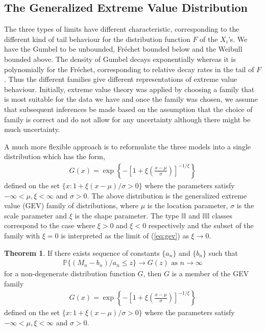 \documentclass[a4paper,10pt]{article}
\theoremstyle{definition}
\newtheorem{thm}{Theorem}[section]
\numberwithin{equation}{section}
\begin{document}
\subsection{The Generalized Extreme Value Distribution}
The three types of limits have different characteristic, corresponding to the different kind of tail behaviour for the distribution function $F$ of the $X_i$'s. We have the Gumbel to be unbounded, Fr\'echet bounded below and the Weibull bounded above. The density of Gumbel decays exponentially whereas it is polynomially for the Fr\'echet, corresponding to relative decay rates in the tail of $F$. Thus the different families give different representations of extreme value behaviour. Initially, extreme value theory was applied by choosing a family that is most suitable for the data we have and once the family was chosen, we assume that subsequent inferences be made based on the assumption that the choice of family is correct and do not allow for any uncertainty although there might be much uncertainty.

A much more flexible approach is to reformulate the three models into a single distribution which has the form,
\begin{align}\label{eq:gev}
G(x) = \exp \left\{-\left[1+\xi\left(\frac{x-\mu}{\sigma}\right)\right]^{-1/\xi}\right\}
\end{align}
defined on the set $\{x : 1 + \xi(x-\mu)/\sigma>0\}$ where the parameters satisfy $-\infty<\mu, \xi<\infty$ and $\sigma >0$. The above distribution is the generalized extreme value (GEV) family of distributions, where $\mu$ is the location parameter, $\sigma$ is the scale parameter and $\xi$ is the shape parameter. The type $\mathbb{II}$ and $\mathbb{III}$ classes correspond to the case where $\xi >0$ and $\xi<0$ respectively and the subset of the family with $\xi = 0$ is interpreted as the limit of (\ref{eq:gev}) as $\xi \to 0$.

\begin{thm}\label{thm:gev}
If there exists sequence of constants $\{a_n\}$ and $\{b_n\}$ such that 
\begin{align}\label{eq:gevlimit}
\mathbb{P}\{(M_n - b_n)/a_n\leq z\} \to G(z) \text{ as } n \to \infty
\end{align}
for a non-degenerate distribution function $G$, then $G$ is a member of the GEV family
\begin{align}
G(x) = \exp \left\{-\left[1+\xi\left(\frac{x-\mu}{\sigma}\right)\right]^{-1/\xi}\right\}
\end{align}
defined on the set $\{x : 1 + \xi(x-\mu)/\sigma>0\}$ where the parameters satisfy $-\infty<\mu, \xi<\infty$ and $\sigma >0$.
\end{thm}
\end{document}
